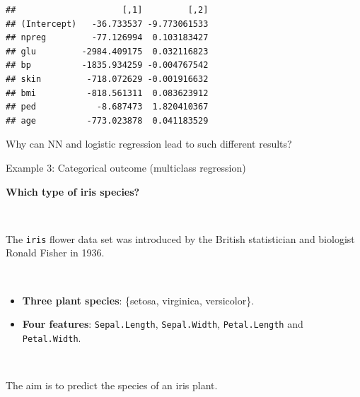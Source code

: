 \documentclass[10pt,ignorenonframetext,]{beamer}
\providecommand{\tightlist}{%
  \setlength{\itemsep}{0pt}\setlength{\parskip}{0pt}}
\begin{document}
\begin{frame}[fragile]
\begin{verbatim}
##                     [,1]         [,2]
## (Intercept)   -36.733537 -9.773061533
## npreg         -77.126994  0.103183427
## glu         -2984.409175  0.032116823
## bp          -1835.934259 -0.004767542
## skin         -718.072629 -0.001916632
## bmi          -818.561311  0.083623912
## ped            -8.687473  1.820410367
## age          -773.023878  0.041183529
\end{verbatim}

\end{frame}

\begin{frame}

Why can NN and logistic regression lead to such different results?

\end{frame}

\begin{frame}[fragile]

\begin{block}{Example 3: Categorical outcome (multiclass regression)}

\textbf{Which type of iris species?}

\(~\)

The \texttt{iris} flower data set was introduced by the British
statistician and biologist Ronald Fisher in 1936.

\(~\)

\begin{itemize}
\tightlist
\item
  \textbf{Three plant species}: \{setosa, virginica, versicolor\}.
\item
  \textbf{Four features}: \texttt{Sepal.Length}, \texttt{Sepal.Width},
  \texttt{Petal.Length} and \texttt{Petal.Width}.
\end{itemize}

\(~\)

The aim is to predict the species of an iris plant.

\end{block}

\end{frame}
\end{document}
